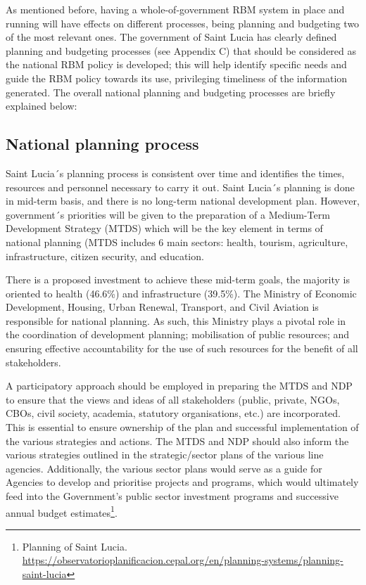 \documentclass[
  10pt,
]{book}
\begin{document}
As mentioned before, having a whole-of-government RBM system in place and running will have effects on different processes, being planning and budgeting two of the most relevant ones. The government of Saint Lucia has clearly defined planning and budgeting processes (see Appendix C) that should be considered as the national RBM policy is developed; this will help identify specific needs and guide the RBM policy towards its use, privileging timeliness of the information generated. The overall national planning and budgeting processes are briefly explained below:

\hypertarget{national-planning-process}{%
\subsection{National planning process}\label{national-planning-process}}

Saint Lucia´s planning process is consistent over time and identifies the times, resources and personnel necessary to carry it out. Saint Lucia´s planning is done in mid-term basis, and there is no long-term national development plan. However, government´s priorities will be given to the preparation of a Medium-Term Development Strategy (MTDS) which will be the key element in terms of national planning (MTDS includes 6 main sectors: health, tourism, agriculture, infrastructure, citizen security, and education.

There is a proposed investment to achieve these mid-term goals, the majority is oriented to health (46.6\%) and infrastructure (39.5\%). The Ministry of Economic Development, Housing, Urban Renewal, Transport, and Civil Aviation is responsible for national planning. As such, this Ministry plays a pivotal role in the coordination of development planning; mobilisation of public resources; and ensuring effective accountability for the use of such resources for the benefit of all stakeholders.

A participatory approach should be employed in preparing the MTDS and NDP to ensure that the views and ideas of all stakeholders (public, private, NGOs, CBOs, civil society, academia, statutory organisations, etc.) are incorporated. This is essential to ensure ownership of the plan and successful implementation of the various strategies and actions. The MTDS and NDP should also inform the various strategies outlined in the strategic/sector plans of the various line agencies. Additionally, the various sector plans would serve as a guide for Agencies to develop and prioritise projects and programs, which would ultimately feed into the Government's public sector investment programs and successive annual budget estimates\footnote{Planning of Saint Lucia. \url{https://observatorioplanificacion.cepal.org/en/planning-systems/planning-saint-lucia}}.
\end{document}
